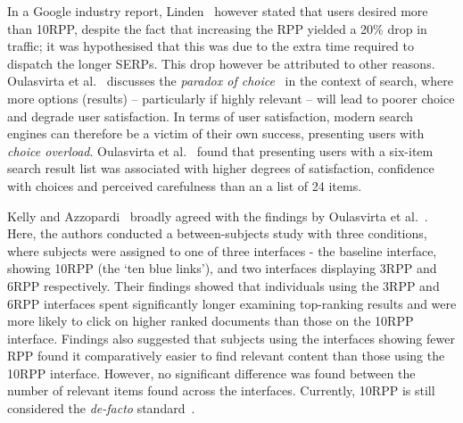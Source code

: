 In a Google industry report, Linden~\cite{linden2006} however stated that users desired more than 10RPP, despite the fact that increasing the RPP yielded a 20\% drop in traffic; it was hypothesised that this was due to the extra time required to dispatch the longer SERPs. This drop however be attributed to other reasons. Oulasvirta et al.~\cite{oulasvirta2009serp_size} discusses the \emph{paradox of choice}~\cite{schwartz2005paradox_of_choice} in the context of search, where more options (results) -- particularly if highly relevant -- will lead to poorer choice and degrade user satisfaction. In terms of user satisfaction, modern search engines can therefore be a victim of their own success, presenting users with \emph{choice overload}. Oulasvirta et al.~\cite{oulasvirta2009serp_size} found that presenting users with a six-item search result list was associated with higher degrees of satisfaction, confidence with choices and perceived carefulness than an a list of 24 items.

Kelly and Azzopardi~\cite{kelly2015results_per_page} broadly agreed with the findings by Oulasvirta et al.~\cite{oulasvirta2009serp_size}. Here, the authors conducted a between-subjects study with three conditions, where subjects were assigned to one of three interfaces - the baseline interface, showing 10RPP (the `ten blue links'), and two interfaces displaying 3RPP and 6RPP respectively. Their findings showed that individuals using the 3RPP and 6RPP interfaces spent significantly longer examining top-ranking results and were more likely to click on higher ranked documents than those on the 10RPP interface.  Findings also suggested that subjects using the interfaces showing fewer RPP found it comparatively easier to find relevant content than those using the 10RPP interface. However, no significant difference was found between the number of relevant items found across the interfaces. Currently, 10RPP is still considered the \emph{de-facto} standard~\cite{hearst2009_search}.


